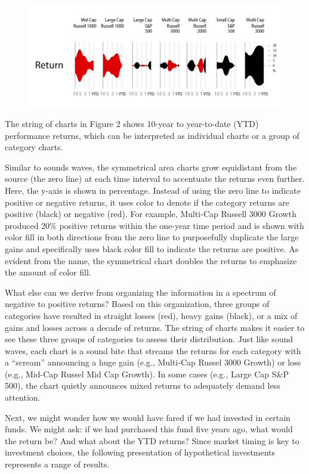 \documentclass[]{book}
\theoremstyle{definition}
\theoremstyle{definition}
\theoremstyle{definition}
\theoremstyle{remark}
\begin{document}
\begin{figure}
\centering
\includegraphics{images/pattern-2.jpg}
\caption{}
\end{figure}

The string of charts in Figure 2 shows 10-year to year-to-date (YTD)
performance returns, which can be interpreted as individual charts or a
group of category charts.

Similar to sounds waves, the symmetrical area charts grow equidistant
from the source (the zero line) at each time interval to accentuate the
returns even further. Here, the y-axis is shown in percentage. Instead
of using the zero line to indicate positive or negative returns, it uses
color to denote if the category returns are positive (black) or negative
(red). For example, Multi-Cap Russell 3000 Growth produced 20\% positive
returns within the one-year time period and is shown with color fill in
both directions from the zero line to purposefully duplicate the large
gains and specifically uses black color fill to indicate the returns are
positive. As evident from the name, the symmetrical chart doubles the
returns to emphasize the amount of color fill.

What else can we derive from organizing the information in a spectrum of
negative to positive returns? Based on this organization, three groups
of categories have resulted in straight losses (red), heavy gains
(black), or a mix of gains and losses across a decade of returns. The
string of charts makes it easier to see these three groups of categories
to assess their distribution. Just like sound waves, each chart is a
sound bite that streams the returns for each category with a ``scream''
announcing a huge gain (e.g., Multi-Cap Russel 3000 Growth) or loss
(e.g., Mid-Cap Russel Mid Cap Growth). In some cases (e.g., Large Cap
S\&P 500), the chart quietly announces mixed returns to adequately
demand less attention.

Next, we might wonder how we would have fared if we had invested in
certain funds. We might ask: if we had purchased this fund five years
ago, what would the return be? And what about the YTD returns? Since
market timing is key to investment choices, the following presentation
of hypothetical investments represents a range of results.
\end{document}

